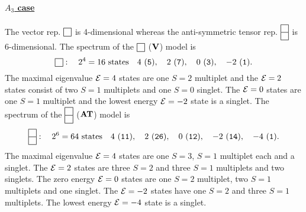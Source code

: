 \documentclass[a4paper,12pt]{article}
\def\sqr#1#2{{\vcenter{\hrule height.#2pt
      \hbox{\vrule width.#2pt height#1pt \kern#1pt
          \vrule width.#2pt}
      \hrule height.#2pt}}}
\def\twosqr#1#2{{\vcenter{\hrule height.#2pt
      \hbox{\vrule width.#2pt height#1pt \kern#1pt
          \vrule width.#2pt}
      \hrule height.#2pt
      \hbox{\vrule width.#2pt height#1pt \kern#1pt
          \vrule width.#2pt}
      \hrule height.#2pt}}}
\begin{document}
\paragraph{\underline{$A_3$ case}} The vector rep.
$\sqr{9}5$ is 4-dimensional
whereas the anti-symmetric tensor rep. $\twosqr{9}5$ is 6-dimensional.
The spectrum of the $\sqr{9}5$ (${\bf V}$) model is
\begin{equation}
\sqr{9}5:\quad 2^4=16\ \mbox{states}\quad
4\ ({\tt 5}), \quad 2\ ({\tt 7}), \quad 0\ ({\tt 3}), \quad -2\ ({\tt 1}).
\label{a3v}
\end{equation}
The maximal eigenvalue ${\cal E}=4$ states are one
$S=2$ multiplet and the ${\cal
E}=2$ states consist of two $S=1$ multiplets and one $S=0$ singlet.
The ${\cal E}=0$ states are one $S=1$ multiplet and
the lowest energy ${\cal E}=-2$
state is a singlet. The spectrum of the $\twosqr{9}5$ (${\bf AT}$) model is
\begin{equation}
\twosqr{9}5:\quad 2^6=64\ \mbox{states}\quad
4\ ({\tt 11}), \quad 2\ ({\tt 26}), \quad 0\ ({\tt 12}), \quad -2\ ({\tt
14}),
\quad -4\ ({\tt 1}).
\end{equation}
The maximal eigenvalue ${\cal E}=4$ states are one $S=3$,
$S=1$ multiplet each and
a singlet.
The ${\cal E}=2$ states are three $S=2$ and three $S=1$ multiplets and two
singlets.
The zero energy  ${\cal E}=0$ states are one $S=2$ multiplet,
two $S=1$ multiplets
and one singlet.
The ${\cal E}=-2$ states have one $S=2$ and three $S=1$ multiplets. The
lowest
energy ${\cal E}=-4$ state is a singlet.
\end{document}
